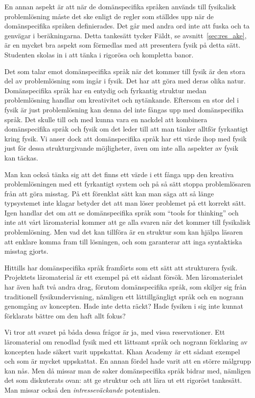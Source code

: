En annan aspekt är att när de domänspecifika språken används till fysikalisk
problemlösning måste det ske enligt de regler som ställdes upp när de
domänspecifika språken definierades. Det går med andra ord inte att fuska och ta
genvägar i beräkningarna. Detta tankesätt tycker Fäldt, se
avsnitt~\ref{sec:res_ake}, är en mycket bra aspekt som förmedlas med att
presentera fysik på detta sätt. Studenten skolas in i att tänka i rigorösa och
kompletta banor.

Det som talar emot
domänspecifika språk när det kommer till fysik är den stora del av problemlösning
som ingår i fysik. Det har att göra med deras olika natur. Domänspecifika språk
har en entydig och fyrkantig struktur medan problemlösning handlar om
kreativitet och nytänkande. Eftersom en stor del i fysik är just problemlösning
kan denna del inte fångas upp med domänspecifika språk. Det skulle till och med
kunna vara en nackdel att kombinera domänspecifika språk och fysik om det leder
till att man tänker alltför fyrkantigt kring fysik. Vi anser dock att
domänspecifika språk har ett värde ihop med fysik just för dessa strukturgivande
möjligheter, även om inte alla aspekter av fysik kan täckas. 

Man kan också
tänka sig att det finns ett värde i ett fånga upp den kreativa problemlösningen
med ett fyrkantigt system och på så sätt stoppa problemlösaren från att göra
misstag. På ett förenklat sätt kan man säga att så länge typsystemet inte klagar
betyder det att man löser problemet på ett korrekt sätt. Igen handlar det om att se
domänspecifika språk som ``tools for thinking'' och inte att vårt
läromaterial kommer att ge alla svaren när det kommer till fysikalisk
problemlösning. Men vad det kan tillföra är en struktur som kan hjälpa
läsaren att enklare komma fram till lösningen, och som garanterar att inga
syntaktiska misstag gjorts.

Hittills har domänspecifika språk framförts som ett sätt att strukturera fysik.
Projektets läromaterial är ett exempel på ett sådant försök. Men läromaterialet
har även haft två andra drag, förutom domänspecifika språk, som skiljer sig från
traditionell fysikundervisning, nämligen ett lättillgängligt språk och en
nogrann genomgång av koncepten. Hade inte detta räckt? Hade fysiken i sig inte
kunnat förklarats bättre om den haft allt fokus?

Vi tror att svaret på båda dessa frågor är ja, med vissa reservationer. Ett
läromaterial om renodlad fysik med ett lättsamt språk och nogrann förklaring av
koncepten hade säkert varit uppskattat. Khan Academy är ett sådant
exempel~\cite{khan} och som är mycket uppskattat. En annan fördel hade varit att en större målgrupp kan nås.
Men då missar man de saker domänspecifika språk bidrar med, nämligen det som
diskuterats ovan: att ge struktur och att lära ut ett rigoröst tankesätt. Man
missar också den \textit{intresseväckande} potentialen.

